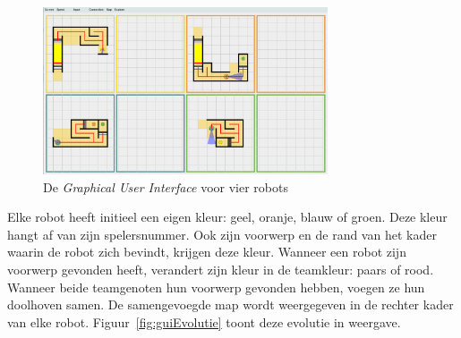 \documentclass[eind]{penoverslag}
\begin{document}
\begin{figure}[h]
\centering
	\includegraphics[width=0.75\textwidth]{gui4Robots}
\caption{De \textit{Graphical User Interface} voor vier robots}
\label{fig:gui4}
\end{figure}

Elke robot heeft initieel een eigen kleur: geel, oranje, blauw of groen. Deze kleur hangt af van zijn spelersnummer. Ook zijn voorwerp en de rand van het kader waarin de robot zich bevindt, krijgen deze kleur. Wanneer een robot zijn voorwerp gevonden heeft, verandert zijn kleur in de teamkleur: paars of rood. Wanneer beide teamgenoten hun voorwerp gevonden hebben, voegen ze hun doolhoven samen. De samengevoegde map wordt weergegeven in de rechter kader van elke robot. Figuur~\ref{fig:guiEvolutie} toont deze evolutie in weergave.\\
\end{document}
